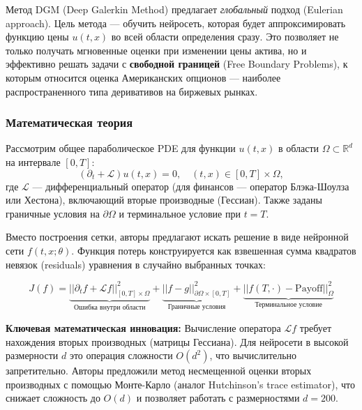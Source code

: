 \documentclass[12pt, a4paper]{article}
\begin{document}
Метод DGM (Deep Galerkin Method) предлагает \textit{глобальный} подход (Eulerian approach). Цель метода — обучить нейросеть, которая будет аппроксимировать функцию цены $u(t, x)$ во всей области определения сразу. Это позволяет не только получать мгновенные оценки при изменении цены актива, но и эффективно решать задачи с \textbf{свободной границей} (Free Boundary Problems), к которым относится оценка Американских опционов — наиболее распространенного типа деривативов на биржевых рынках.

\subsubsection{Математическая теория}
Рассмотрим общее параболическое PDE для функции $u(t, x)$ в области $\Omega \subset \mathbb{R}^d$ на интервале $[0, T]$:
\begin{equation}
    (\partial_t + \mathcal{L})u(t, x) = 0, \quad (t, x) \in [0, T] \times \Omega,
\end{equation}
где $\mathcal{L}$ — дифференциальный оператор (для финансов — оператор Блэка-Шоулза или Хестона), включающий вторые производные (Гессиан). Также заданы граничные условия на $\partial \Omega$ и терминальное условие при $t=T$.

Вместо построения сетки, авторы предлагают искать решение в виде нейронной сети $f(t, x; \theta)$. Функция потерь конструируется как взвешенная сумма квадратов невязок (residuals) уравнения в случайно выбранных точках:

\begin{equation}
    J(f) = \underbrace{|| \partial_t f + \mathcal{L}f ||^2_{[0,T]\times \Omega}}_{\text{Ошибка внутри области}} + \underbrace{||f - g||^2_{\partial \Omega \times [0, T]}}_{\text{Граничные условия}} + \underbrace{||f(T, \cdot) - \text{Payoff}||^2_{\Omega}}_{\text{Терминальное условие}}
\end{equation}

\textbf{Ключевая математическая инновация:}
Вычисление оператора $\mathcal{L}f$ требует нахождения вторых производных (матрицы Гессиана). Для нейросети в высокой размерности $d$ это операция сложности $O(d^2)$, что вычислительно запретительно. Авторы предложили метод несмещенной оценки вторых производных с помощью Монте-Карло (аналог Hutchinson's trace estimator), что снижает сложность до $O(d)$ и позволяет работать с размерностями $d=200$.
\end{document}
